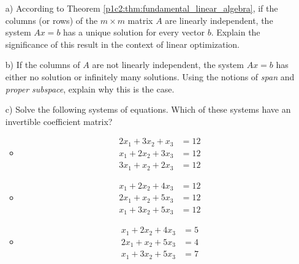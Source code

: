 \begin{itemize}
	\item[a)] According to Theorem \ref{p1c2:thm:fundamental_linear_algebra}, if the columns (or rows) of the $m \times m$ matrix $A$ are linearly independent, the system $Ax=b$ has a unique solution for every vector $b$. Explain the significance of this result in the context of linear optimization.
	\item[b)] If the columns of $A$ are not linearly independent, the system $Ax = b$ has either no solution or infinitely many solutions. Using the notions of \emph{span} and \emph{proper subspace}, explain why this is the case. 
	\item[c)] Solve the following systems of equations. Which of these systems have an invertible coefficient matrix? 
	\begin{itemize}
		\item \begin{align}
			2x_1 + 3x_2 + x_3 &= 12\\
			x_1 + 2x_2 + 3x_3 &= 12\\
			3x_1 + x_2 + 2x_3 &= 12
		\end{align}
		\item \begin{align}
			x_1 + 2x_2 + 4x_3 &= 12\\
			2x_1 + x_2 + 5x_3 &= 12\\
			x_1 + 3x_2 + 5x_3 &= 12
		\end{align}
		\item \begin{align}
			x_1 + 2x_2 + 4x_3 &= 5\\
			2x_1 + x_2 + 5x_3 &= 4\\
			x_1 + 3x_2 + 5x_3 &= 7
		\end{align}
	\end{itemize}
\end{itemize}
